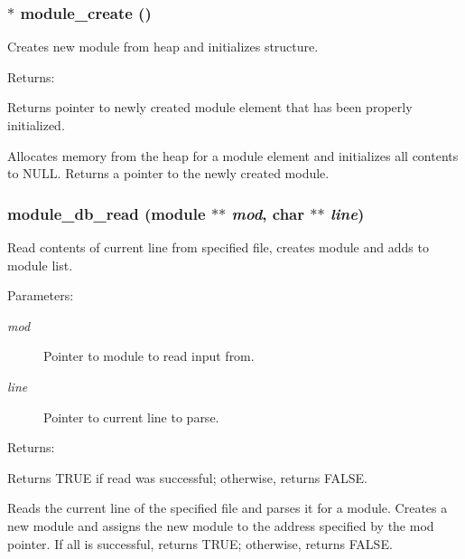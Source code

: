 \subsubsection{$\ast$ module\_\-create ()}\label{module_8c_a1}


Creates new module from heap and initializes structure.

\begin{Desc}
\item[Returns: ]\par
Returns pointer to newly created module element that has been properly initialized.\end{Desc}
Allocates memory from the heap for a module element and initializes all contents to NULL. Returns a pointer to the newly created module. 
\subsubsection{ module\_\-db\_\-read ({\bf module} $\ast$$\ast$ {\em mod}, char $\ast$$\ast$ {\em line})}\label{module_8c_a4}


Read contents of current line from specified file, creates module and adds to module list.

\begin{Desc}
\item[Parameters: ]\par
\begin{description}
\item[{\em 
mod}]Pointer to module to read input from. \item[{\em 
line}]Pointer to current line to parse. \end{description}
\end{Desc}
\begin{Desc}
\item[Returns: ]\par
Returns TRUE if read was successful; otherwise, returns FALSE.\end{Desc}
Reads the current line of the specified file and parses it for a module. Creates a new module and assigns the new module to the address specified by the mod pointer. If all is successful, returns TRUE; otherwise, returns FALSE. 
